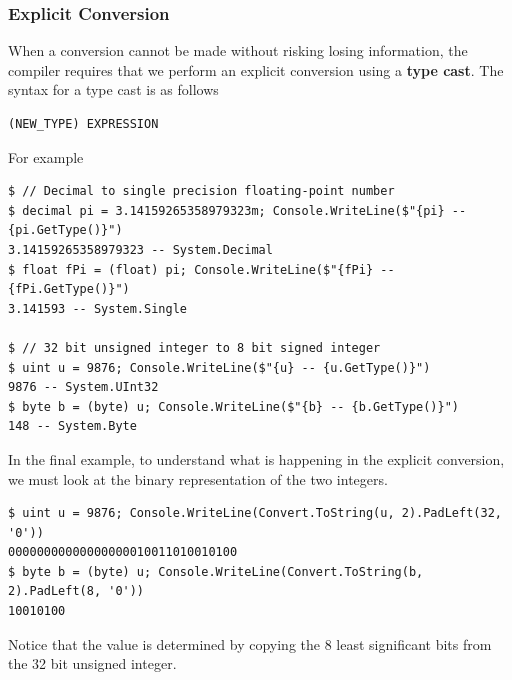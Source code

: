 \documentclass{article}
\begin{document}
\subsubsection{Explicit Conversion}
When a conversion cannot be made without risking losing information,
the compiler requires that we perform an explicit conversion using a \textbf{type cast}.
The syntax for a type cast is as follows
\begin{lstlisting}
(NEW_TYPE) EXPRESSION
\end{lstlisting}
For example
\begin{lstlisting}
$ // Decimal to single precision floating-point number
$ decimal pi = 3.14159265358979323m; Console.WriteLine($"{pi} -- {pi.GetType()}")
3.14159265358979323 -- System.Decimal
$ float fPi = (float) pi; Console.WriteLine($"{fPi} -- {fPi.GetType()}")
3.141593 -- System.Single

$ // 32 bit unsigned integer to 8 bit signed integer
$ uint u = 9876; Console.WriteLine($"{u} -- {u.GetType()}")
9876 -- System.UInt32
$ byte b = (byte) u; Console.WriteLine($"{b} -- {b.GetType()}")
148 -- System.Byte
\end{lstlisting}
In the final example, to understand what is happening in the explicit conversion,
we must look at the binary representation of the two integers.
\begin{lstlisting}
$ uint u = 9876; Console.WriteLine(Convert.ToString(u, 2).PadLeft(32, '0'))
00000000000000000010011010010100
$ byte b = (byte) u; Console.WriteLine(Convert.ToString(b, 2).PadLeft(8, '0'))
10010100
\end{lstlisting}
Notice that the value is determined by copying the 8 least significant bits
from the 32 bit unsigned integer.
\end{document}
